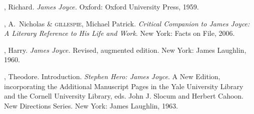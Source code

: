 \begin{bibliohedra}

, Richard.  \textit{James Joyce.}  Oxford: Oxford University
Press, 1959.

, A.~Nicholas \& \textsc{gillespie}, Michael Patrick. 
\textit{Critical Companion to James Joyce: A Literary Reference to His Life and Work}.
New York: Facts on File, 2006.

, Harry.  \textit{James Joyce.}  Revised, augmented edition.  New
York: James Laughlin, 1960.

, Theodore.  Introduction.  \textit{Stephen Hero: James Joyce}. 
A New Edition, incorporating the Additional Manuscript Pages in the Yale
University Library and the Cornell University Library, eds. John J.
Slocum and Herbert Cahoon.  New Directions Series.  New York: James
Laughlin, 1963.

\end{bibliohedra}

